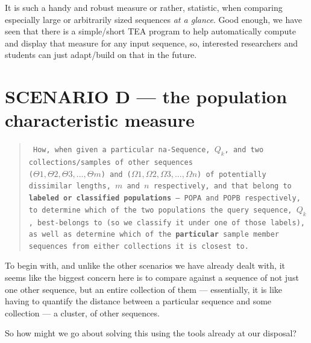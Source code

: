 \documentclass[a4paper, 18pt]{book} %
\begin{document}
It is such a handy and robust measure or rather, statistic, when comparing especially large or arbitrarily sized sequences \textit{at a glance}. Good enough, we have seen that there is a simple/short TEA program to help automatically compute and display that measure for any input sequence, so, interested researchers and students can just adapt/build on that in the future.

\section{SCENARIO D --- the population characteristic measure}
\label{SECSCEND}

\begin{quote}
\small
\texttt{
How, when given a particular na-Sequence, $Q_k$, and two collections/samples of other sequences\\
 ($\Theta1, \Theta2, \Theta3,..., \Theta m$) and ($\Omega1, \Omega2, \Omega3,..., \Omega n$) of potentially dissimilar lengths, $m$ and $n$ respectively, and that belong to \textbf{labeled or classified populations} --- POPA and POPB respectively, to determine which of the two populations the query sequence, $Q_k$, best-belongs to (so we classify it under one of those labels), as well as determine which of the \textbf{particular} sample member sequences from either collections it is closest to.}
\end{quote}


To begin with, and unlike the other scenarios we have already dealt with, it seems like the biggest concern here is to compare against a sequence of not just one other sequence, but an entire collection of them --- essentially, it is like having to quantify the distance between a particular sequence and some collection --- a cluster, of other sequences. 

So how might we go about solving this using the tools already at our disposal?
\end{document}
